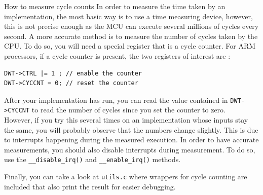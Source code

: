 \begin{bclogo}[couleur = gray!20, arrondi = 0.2, logo=\bcinfo]{How to measure cycle counts} In order to measure the time taken by an implementation, the most basic way is to use a time measuring device, however, this is not precise enough as the MCU can execute several millions of cycles every second. A more accurate method is to measure the number of cycles taken by the CPU. To do so, you will need a special register that is a cycle counter. For ARM processors, if a cycle counter is present, the two registers of interest are :
\begin{lstlisting}[style=customc]
DWT->CTRL |= 1 ; // enable the counter
DWT->CYCCNT = 0; // reset the counter
\end{lstlisting}
After your implementation has run, you can read the value contained in \texttt{DWT->CYCCNT} to read the number of cycles since you set the counter to zero.\\

However, if you try this several times on an implementation whose inputs stay the same, you will probably observe that the numbers change slightly. This is due to interrupts happening during the measured execution. In order to have accurate measurements, you should also disable interrupts during measurement. To do so, use the  \texttt{\_\_disable\_irq()} and \texttt{\_\_enable\_irq()} methods.

Finally, you can take a look at \texttt{utils.c} where wrappers for cycle counting are included that also print the result for easier debugging.
\end{bclogo}



